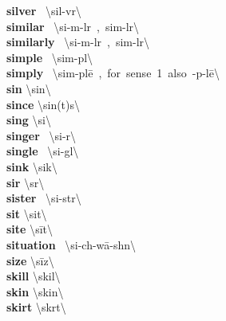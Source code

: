 \documentclass[10pt,a4paper]{article}
\begin{document}
\begin{multicols}{2}
\textbf{ silver }\quad \ \textbackslash \textprimstress sil-v\textschwa r\textbackslash \\
\textbf{ similar }\quad \ \textbackslash \textprimstress si-m\textschwa -l\textschwa r\ ,\ \textprimstress sim-l\textschwa r\textbackslash \\
\textbf{ similarly }\quad \ \textbackslash \textprimstress si-m\textschwa -l\textschwa r\ ,\ \textprimstress sim-l\textschwa r\textbackslash \\
\textbf{ simple }\quad \ \textbackslash \textprimstress sim-p\textschwa l\textbackslash \\
\textbf{ simply }\quad \ \textbackslash \textprimstress sim-pl\={e}\ ,\ for\ sense\ 1\ also\ -p\textschwa -l\={e}\textbackslash \\
\textbf{ sin }\quad \textbackslash \textprimstress sin\textbackslash \\
\textbf{ since }\quad \textbackslash \textprimstress sin(t)s\textbackslash \\
\textbf{ sing }\quad \textbackslash \textprimstress si\engma \textbackslash \\
\textbf{ singer }\quad \ \textbackslash \textprimstress si\engma -\textschwa r\textbackslash \\
\textbf{ single }\quad \ \textbackslash \textprimstress si\engma -g\textschwa l\textbackslash \\
\textbf{ sink }\quad \textbackslash \textprimstress si\engma k\textbackslash \\
\textbf{ sir }\quad \textbackslash \textprimstress s\textschwa r\textbackslash \\
\textbf{ sister }\quad \ \textbackslash \textprimstress si-st\textschwa r\textbackslash \\
\textbf{ sit }\quad \textbackslash \textprimstress sit\textbackslash \\
\textbf{ site }\quad \textbackslash \textprimstress s\={i}t\textbackslash \\
\textbf{ situation }\quad \ \textbackslash \textsecstress si-ch\textschwa -\textprimstress w\={a}-sh\textschwa n\textbackslash \\
\textbf{ size }\quad \textbackslash \textprimstress s\={i}z\textbackslash \\
\textbf{ skill }\quad \textbackslash \textprimstress skil\textbackslash \\
\textbf{ skin }\quad \textbackslash \textprimstress skin\textbackslash \\
\textbf{ skirt }\quad \textbackslash \textprimstress sk\textschwa rt\textbackslash \\

\end{multicols}
\end{document}
